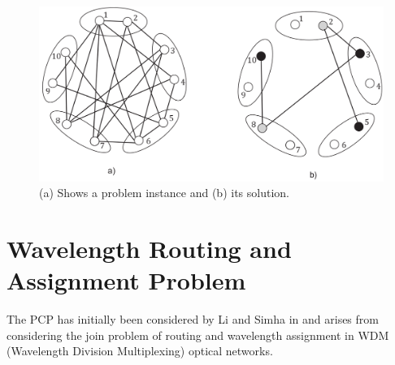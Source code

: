 \begin{figure}
\begin{center}
\includegraphics[scale=0.3]{figures/pcp.png}
\caption{(a) Shows a problem instance and (b) its solution.}
\label{pd:pcpExample}
\end{center}
\end{figure}


\section{Wavelength Routing and Assignment Problem}

The PCP has initially been considered by Li and Simha in \cite{li-00} and arises from considering the join problem of routing and wavelength assignment in WDM (Wavelength Division Multiplexing) optical networks. 


